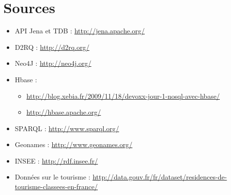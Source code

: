 \documentclass{article}
\begin{document}
\section{Sources}
\begin{itemize}
\item API Jena et TDB : \href{http://jena.apache.org/}{http://jena.apache.org/}
 \\
\item D2RQ : \href{http://d2rq.org/}{http://d2rq.org/}
\\
\item Neo4J : \href{http://neo4j.org/}{http://neo4j.org/}
\\
\item Hbase :\label{sec:shbase}
\begin{itemize}
\item \href{http://blog.xebia.fr/2009/11/18/devoxx-jour-1-nosql-avec-hbase/}{http://blog.xebia.fr/2009/11/18/devoxx-jour-1-nosql-avec-hbase/}
 \item \href{http://hbase.apache.org/}{http://hbase.apache.org/}
\end{itemize}

\item SPARQL : \href{http://www.sparql.org/}{http://www.sparql.org/}
\\
\item Geonames : \href{http://www.geonames.org/}{http://www.geonames.org/}
\\
\item INSEE : \href{http://rdf.insee.fr/}{http://rdf.insee.fr/}
\\
\item Données sur le tourisme : \href{http://data.gouv.fr/fr/dataset/residences-de-tourisme-classees-en-france/}{http://data.gouv.fr/fr/dataset/residences-de-tourisme-classees-en-france/}

\end{itemize}

\end{document}
